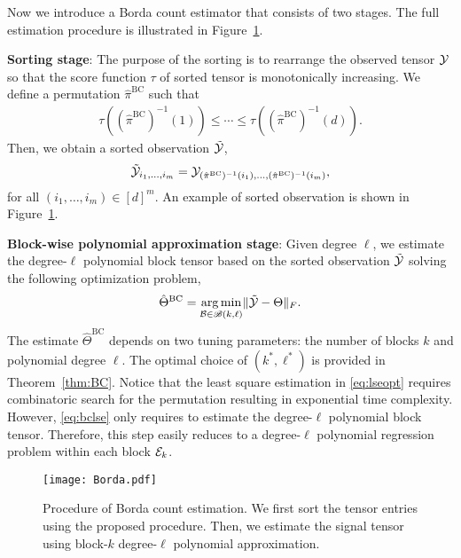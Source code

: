 \documentclass{article}
\theoremstyle{definition}
\def\caliB{\mathscr{B}}
\begin{document}
Now we introduce a Borda count estimator that consists of two stages. The full estimation procedure is illustrated in Figure~\ref{fig:borda}.

  {\bf Sorting stage}: The purpose of the sorting is to rearrange the observed tensor $\mathcal{Y}$ so that the score function $\tau$ of sorted tensor  is  monotonically increasing. We define a permutation $\hat\pi^{\text{BC}}$  such that
    \begin{align}\label{eq:permute}
        \tau((\hat\pi^{\text{BC}})^{-1}(1))\leq \cdots \leq \tau((\hat\pi^{\text{BC}})^{-1}(d)).
    \end{align}
    Then, we obtain a sorted observation $\tilde{\mathcal{Y}}$,
    \begin{align}
        \tilde{\mathcal{Y}}_{i_1,\ldots,i_m} = \mathcal{Y}_{(\hat\pi^{\text{BC}})^{-1}(i_1),\ldots,(\hat\pi^{\text{BC}})^{-1}(i_m)},
    \end{align}
for all $(i_1,\ldots,i_m)\in[d]^m.$ An example of sorted observation is shown in Figure~\ref{fig:borda}.

 {\bf Block-wise polynomial approximation stage}: Given degree $\ell$, we estimate the degree-$\ell$ polynomial block tensor based on the sorted observation $\tilde{\mathcal{Y}}$ solving the following optimization problem,
    \begin{align}\label{eq:bclse}
        \hat\Theta^{\text{BC}} = \argmin_{\tB\in\caliB(k,\ell)}\FnormSize{}{\tilde\tY-\Theta}.
    \end{align}
    The estimate $\hat\Theta^{\text{BC}}$  depends on two tuning parameters: the number of blocks $k$ and polynomial degree $\ell$. The optimal choice of $(k^*,\ell^*)$ is provided in Theorem~\ref{thm:BC}.
    Notice that the least square estimation in \eqref{eq:lseopt} requires combinatoric search for the permutation resulting in exponential time complexity. However, \eqref{eq:bclse} only requires to estimate the degree-$\ell$ polynomial block tensor. Therefore, this step easily reduces to a degree-$\ell$ polynomial regression problem within each block $\mathcal{E}_k$. 
\begin{figure}[htp]
    \centering
    \texttt{[image: Borda.pdf]}
    \caption{Procedure of Borda count estimation. We first sort the tensor entries using the proposed procedure. Then, we estimate the signal tensor using block-$k$ degree-$\ell$ polynomial approximation.}
    \label{fig:borda}
    \vspace{-.4cm}
\end{figure}
\vspace{-.2cm}
\end{document}
